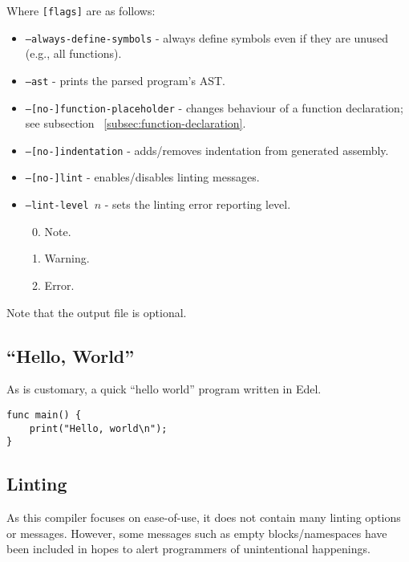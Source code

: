Where \texttt{[flags]} are as follows:
\begin{itemize}
    \item \texttt{--always-define-symbols} - always define symbols even if they are unused (e.g., all functions).
    \item \texttt{--ast} - prints the parsed program's AST.
    \item \texttt{--[no-]function-placeholder} - changes behaviour of a function declaration; see subsection ~\ref{subsec:function-declaration}.
    \item \texttt{--[no-]indentation} - adds/removes indentation from generated assembly.
    \item \texttt{--[no-]lint} - enables/disables linting messages.
    \item \texttt{--lint-level \(n\)} - sets the linting error reporting level.
    \begin{enumerate} \setcounter{enumi}{-1}
        \item Note.
        \item Warning.
        \item Error.
    \end{enumerate}
\end{itemize}
Note that the output file is optional.

\subsection{``Hello, World''}\label{subsec:hello-world}

As is customary, a quick ``hello world'' program written in Edel.

\begin{lstlisting}[language=CustomLang]
func main() {
    print("Hello, world\n");
}
\end{lstlisting}

\subsection{Linting}

As this compiler focuses on ease-of-use, it does not contain many linting options or messages.
However, some messages such as empty blocks/namespaces have been included in hopes to alert programmers of unintentional happenings.